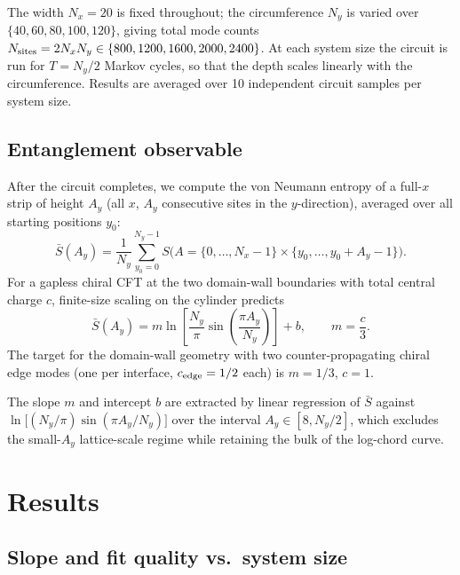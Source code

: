\documentclass[aps,prb,twocolumn,showpacs,floatfix]{revtex4-2}
\newcommand{\Ny}{N_y}
\newcommand{\Nx}{N_x}
\newcommand{\Nsites}{N_{\rm sites}}
\begin{document}
The width $\Nx = 20$ is fixed throughout; the circumference $\Ny$ is varied
over $\{40, 60, 80, 100, 120\}$, giving total mode counts
$\Nsites = 2\Nx\Ny \in \{800, 1200, 1600, 2000, 2400\}$.
At each system size the circuit is run for $T = \Ny/2$ Markov cycles,
so that the depth scales linearly with the circumference.
Results are averaged over 10 independent circuit samples per system size.

\subsection{Entanglement observable}

After the circuit completes, we compute the von Neumann entropy of a full-$x$
strip of height $A_y$ (all $x$, $A_y$ consecutive sites in the $y$-direction),
averaged over all starting positions $y_0$:
\begin{equation}
\bar{S}(A_y) = \frac{1}{\Ny}\sum_{y_0=0}^{\Ny-1}
S\!\bigl(A = \{0,\ldots,\Nx-1\}\times\{y_0,\ldots,y_0+A_y-1\}\bigr).
\label{eq:avg_entropy}
\end{equation}
For a gapless chiral CFT at the two domain-wall boundaries with total central charge
$c$, finite-size scaling on the cylinder predicts
\begin{equation}
\bar{S}(A_y) = m\ln\!\left[\frac{\Ny}{\pi}\sin\!\left(\frac{\pi A_y}{\Ny}\right)\right]
+ b,
\qquad m = \frac{c}{3}.
\label{eq:log_chord}
\end{equation}
The target for the domain-wall geometry with two counter-propagating chiral edge
modes (one per interface, $c_{\rm edge} = 1/2$ each) is $m = 1/3$, $c = 1$.

The slope $m$ and intercept $b$ are extracted by linear regression of $\bar{S}$
against $\ln\bigl[(\Ny/\pi)\sin(\pi A_y/\Ny)\bigr]$ over the interval
$A_y \in [8, \Ny/2]$, which excludes the small-$A_y$ lattice-scale regime
while retaining the bulk of the log-chord curve.

\section{Results}
\label{sec:results}

\subsection{Slope and fit quality vs.\ system size}
\end{document}
